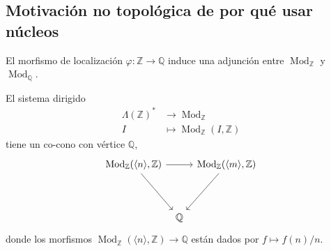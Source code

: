\documentclass[12pt,letterpaper,titlepage]{article}
\theoremstyle{definition}
\renewcommand\phi{\varphi}
\newcommand\Z{\mathbb Z}
\newcommand\Q{\mathbb Q}
\newcommand\<{\langle}
\renewcommand\>{\rangle}
\DeclareMathOperator{\Mod}{Mod}
\begin{document}
\subsection{Motivación no topológica de por qué usar núcleos}

El morfismo de localización $\phi:\Z\to\Q$ induce una adjunción
entre $\Mod_\Z$ y $\Mod_\Q$.

El sistema dirigido
\begin{align*}
     \Lambda(\Z)^* &\to \Mod_\Z \\
     I &\mapsto \Mod_\Z(I,\Z)
\end{align*}
tiene un co-cono con vértice $\Q$,
\[
    \begin{tikzcd}[column sep=2mm]
      \Mod_\Z(\<n\>,\Z) \ar[rr] \ar[dr]
      && \Mod_\Z(\<m\>,\Z) \ar[dl] \\[7mm]
      & \Q
    \end{tikzcd}
\]
donde los morfismos $\Mod_\Z(\<n\>,\Z)\to\Q$ están dados por
$f\mapsto f(n)/n$.
\end{document}
